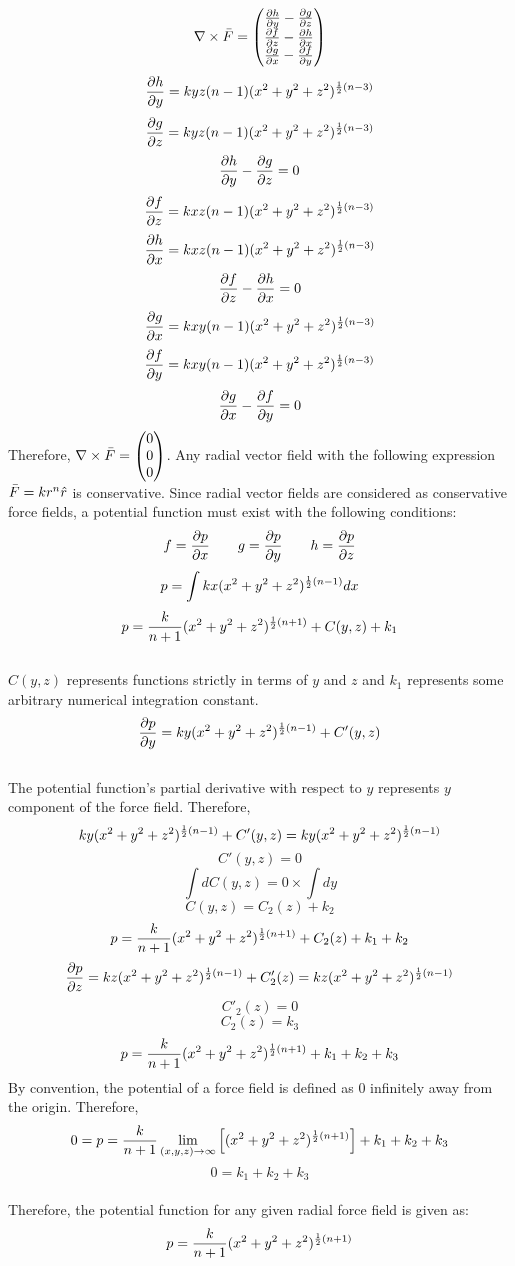 \documentclass[class=report, 12pt, crop=false]{standalone}
\begin{document}
\begin{center}
\renewcommand\arraystretch{1.5}
$$\nabla \times \bar{F} = \begin{pmatrix} \frac{\partial h}{\partial y} - \frac{\partial g}{\partial z} \\ \frac{\partial f}{\partial z} - \frac{\partial h}{\partial x} \\ \frac{\partial g}{\partial x} - \frac{\partial f}{\partial y}\end{pmatrix}$$
\renewcommand\arraystretch{1.0}
$$\frac{\partial h}{\partial y} = kyz(n - 1)(x^2 + y^2 + z^2)^{\frac{1}{2}(n-3)}$$
$$\frac{\partial g}{\partial z} = kyz(n - 1)(x^2 + y^2 + z^2)^{\frac{1}{2}(n-3)}$$
$$\frac{\partial h}{\partial y} - \frac{\partial g}{\partial z} = 0$$
$$\frac{\partial f}{\partial z} = kxz(n - 1)(x^2 + y^2 + z^2)^{\frac{1}{2}(n-3)}$$
$$\frac{\partial h}{\partial x} = kxz(n - 1)(x^2 + y^2 + z^2)^{\frac{1}{2}(n-3)}$$
$$\frac{\partial f}{\partial z} - \frac{\partial h}{\partial x} = 0$$
$$\frac{\partial g}{\partial x} = kxy(n - 1)(x^2 + y^2 + z^2)^{\frac{1}{2}(n-3)}$$
$$\frac{\partial f}{\partial y} = kxy(n - 1)(x^2 + y^2 + z^2)^{\frac{1}{2}(n-3)}$$
$$\frac{\partial g}{\partial x} - \frac{\partial f}{\partial y} = 0$$
Therefore, $\displaystyle{\nabla\times \bar{F} = \begin{pmatrix}0\\0\\0 \end{pmatrix}}$. Any radial vector field with the following expression $\bar{F} = kr^n\hat{r}$ is conservative. Since radial vector fields are considered as conservative force fields, a potential function must exist with the following conditions: 
$$f = \frac{\partial p}{\partial x}\qquad g = \frac{\partial p}{\partial y}\qquad h = \frac{\partial p}{\partial z}$$
$$p = \int  kx(x^2 + y^2 + z^2)^{\frac{1}{2}(n-1)} dx$$
$$p = \frac{k}{n+1}(x^2+y^2+z^2)^{\frac{1}{2}(n+1)} + C(y,z) + k_1$$
\\$C(y,z)$ represents functions strictly in terms of $y$ and $z$ and $k_1$ represents some arbitrary numerical integration constant.
$$\frac{\partial p}{\partial y} = ky(x^2 + y^2 + z^2)^{\frac{1}{2}(n-1)} + C'(y,z)$$
\\The potential function's partial derivative with respect to $y$ represents $y$ component of the force field. Therefore,
$$ky(x^2 + y^2 + z^2)^{\frac{1}{2}(n-1)} + C'(y,z) = ky(x^2 + y^2 + z^2)^{\frac{1}{2}(n-1)}$$
$$C'(y,z) = 0$$
$$\int dC(y,z) = 0\times\int dy$$
$$C(y,z) = C_2(z) + k_2$$
$$p = \frac{k}{n+1}(x^2+y^2+z^2)^{\frac{1}{2}(n+1)} + C_2(z) + k_1 + k_2$$
$$\frac{\partial p}{\partial z} = kz(x^2 + y^2 + z^2)^{\frac{1}{2}(n-1)} + C_2'(z) = kz(x^2 + y^2 + z^2)^{\frac{1}{2}(n-1)}$$
$$C'_2(z) = 0$$
$$C_2(z) = k_3$$
$$p = \frac{k}{n+1}(x^2+y^2+z^2)^{\frac{1}{2}(n+1)} + k_1 + k_2 + k_3$$
By convention, the potential of a force field is defined as 0 infinitely away from the origin. Therefore, 
$$0 =p = \frac{k}{n + 1}\lim_{(x,y,z)\to\infty} \left[(x^2+y^2+z^2)^{\frac{1}{2}(n+1)}\right] + k_1 + k_2 + k_3$$
$$0 = k_1 + k_2 + k_3$$
\\Therefore, the potential function for any given radial force field is given as:
$$p = \frac{k}{n+1}(x^2+y^2+z^2)^{\frac{1}{2}(n+1)} $$
\end{center}
\end{document}
